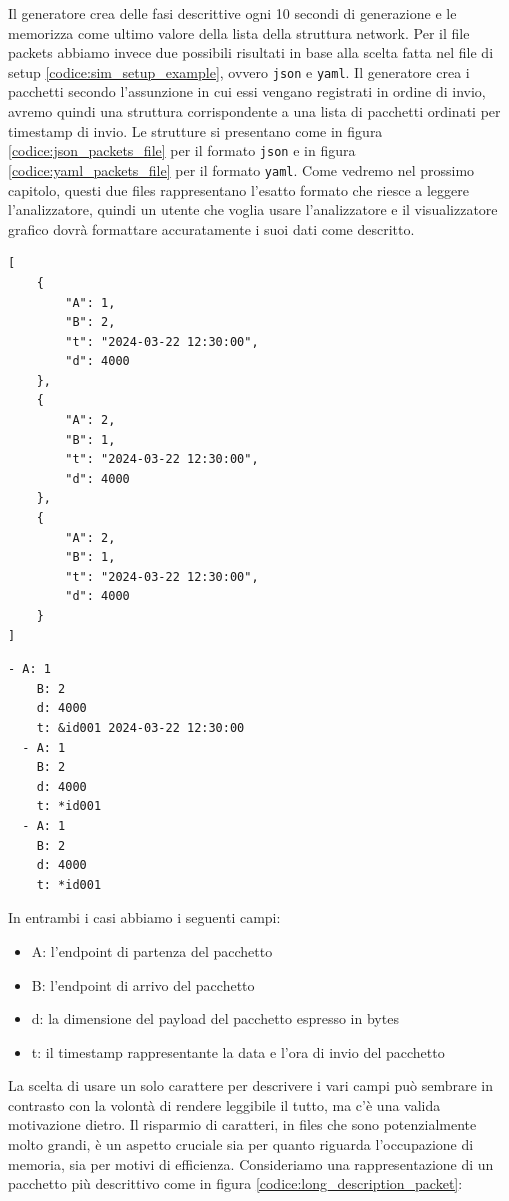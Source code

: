 \documentclass[binding=0.6cm]{sapthesis}
\begin{document}
Il generatore crea delle fasi descrittive ogni 10 secondi di generazione e le memorizza come ultimo valore della lista della struttura network.
Per il file packets abbiamo invece due possibili risultati in base alla scelta fatta nel file di setup \ref{codice:sim_setup_example}, ovvero \texttt{json} e \texttt{yaml}.
Il generatore crea i pacchetti secondo l'assunzione in cui essi vengano registrati in ordine di invio, avremo quindi una struttura corrispondente
a una lista di pacchetti ordinati per timestamp di invio.
Le strutture si presentano come in figura \ref{codice:json_packets_file} per il formato \texttt{json} e in figura \ref{codice:yaml_packets_file} per il formato \texttt{yaml}.
Come vedremo nel prossimo capitolo, questi due files rappresentano l'esatto formato che riesce a leggere l'analizzatore, quindi un utente
che voglia usare l'analizzatore e il visualizzatore grafico dovrà formattare accuratamente i suoi dati come descritto.

{\scriptsize %
\begin{lstlisting}[caption={Esempio di packets file in formato \texttt{json}}, label={codice:json_packets_file}]
[
    {
        "A": 1,
        "B": 2,
        "t": "2024-03-22 12:30:00",
        "d": 4000
    },
    {
        "A": 2,
        "B": 1,
        "t": "2024-03-22 12:30:00",
        "d": 4000
    },
    {
        "A": 2,
        "B": 1,
        "t": "2024-03-22 12:30:00",
        "d": 4000
    }
]
\end{lstlisting}
}

{\scriptsize %
\begin{lstlisting}[caption={Esempio di packets file in formato \texttt{yaml}}, label={codice:yaml_packets_file}]
  - A: 1
    B: 2
    d: 4000
    t: &id001 2024-03-22 12:30:00
  - A: 1
    B: 2
    d: 4000
    t: *id001
  - A: 1
    B: 2
    d: 4000
    t: *id001
\end{lstlisting}
}

In entrambi i casi abbiamo i seguenti campi:
\begin{itemize}
    \item A: l'endpoint di partenza del pacchetto
    \item B: l'endpoint di arrivo del pacchetto
    \item d: la dimensione del payload del pacchetto espresso in bytes
    \item t: il timestamp rappresentante la data e l'ora di invio del pacchetto
\end{itemize}
La scelta di usare un solo carattere per descrivere i vari campi può sembrare in contrasto con la volontà di rendere leggibile il tutto,
ma c'è una valida motivazione dietro. Il risparmio di caratteri, in files che sono potenzialmente molto grandi, è un aspetto cruciale sia per quanto
riguarda l'occupazione di memoria, sia per motivi di efficienza. Consideriamo una rappresentazione di un pacchetto più descrittivo come in figura \ref{codice:long_description_packet}:
\end{document}
